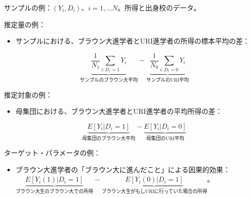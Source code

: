 \documentclass[11pt,handout]{beamer}
\newenvironment{wideitemizeshort}{\itemize}{\enditemize}
\begin{document}
\begin{frame}
\begin{wideitemizeshort}
	\item
	サンプルの例：$(Y_i,D_i)$、$i=1,...N$。所得と出身校のデータ。
	
	\pause 
	
	\item
	推定量の例：
		\begin{itemize}
			\item
			サンプルにおける、ブラウン大進学者とURI進学者の所得の標本平均の差：
			
			$$ \underbrace{\frac{1}{N_1} \sum_{i:D_i=1} Y_i}_{\text{サンプルのブラウン大平均}} - \underbrace{\frac{1}{N_0} \sum_{i:D_i=0} Y_i}_{\text{サンプルのURI平均}}$$		
		\end{itemize}
	
	\pause
		\item
		推定対象の例：
		
				\begin{itemize}
			\item
			母集団における、ブラウン大進学者とURI進学者の平均所得の差：
			
			$$\underbrace{ E[ Y_i | D_i = 1] }_{\text{母集団のブラウン大平均}} - \underbrace{E[Y_i | D_i = 0]}_{\text{母集団のURI平均}}$$
		 
		\end{itemize}
	\pause 
	
	\item
	ターゲット・パラメータの例：
		\begin{itemize}
			\item ブラウン大進学者の「ブラウン大に進んだこと」による因果的効果：
			$\underbrace{E[Y_i(1) | D_i =1]}_{\text{ブラウン大生のブラウン大での所得}} - \underbrace{E[Y_i(0) | D_i = 1]}_{\text{ブラウン大生がもしURIに行っていた場合の所得}} $。
		\end{itemize}
\end{wideitemizeshort}
\end{frame}
\end{document}
